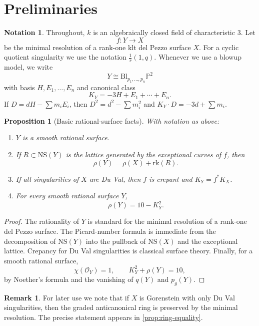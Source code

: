 \documentclass[11pt]{article}
\newtheorem{proposition}[proposition]{Proposition}
\theoremstyle{definition}
\newtheorem{remark}[remark]{Remark}
\newtheorem{notation}[notation]{Notation}
\newcommand{\Pbb}{\mathbb P}
\newcommand{\NS}{\mathrm{NS}}
\newcommand{\rk}{\mathrm{rk}}
\newcommand{\Bl}{\mathrm{Bl}}
\begin{document}
\section{Preliminaries}\label{sec:prelim}

\begin{notation}
Throughout, $k$ is an algebraically closed field of characteristic $3$. Let
\[
f\colon Y\to X
\]
be the minimal resolution of a rank-one klt del Pezzo surface $X$. For a cyclic quotient singularity we use the notation $\frac1r(1,q)$. Whenever we use a blowup model, we write
\[
Y\cong \Bl_{p_1,\dots,p_n}\Pbb^2
\]
with basis $H,E_1,\dots,E_n$ and canonical class
\[
K_Y=-3H+E_1+\cdots+E_n.
\]
If $D=dH-\sum m_iE_i$, then $D^2=d^2-\sum m_i^2$ and $K_Y\cdot D=-3d+\sum m_i$.
\end{notation}

\begin{proposition}[Basic rational-surface facts]\label{prop:basic}
With notation as above:
\begin{enumerate}[label=\textup{(\roman*)}]
\item $Y$ is a smooth rational surface.
\item If $R\subset \NS(Y)$ is the lattice generated by the exceptional curves of $f$, then
\[
\rho(Y)=\rho(X)+\rk(R).
\]
\item If all singularities of $X$ are Du Val, then $f$ is crepant and $K_Y=f^*K_X$.
\item For every smooth rational surface $Y$,
\[
\rho(Y)=10-K_Y^2.
\]
\end{enumerate}
\end{proposition}

\begin{proof}
The rationality of $Y$ is standard for the minimal resolution of a rank-one del Pezzo surface. The Picard-number formula is immediate from the decomposition of $\NS(Y)$ into the pullback of $\NS(X)$ and the exceptional lattice. Crepancy for Du Val singularities is classical surface theory. Finally, for a smooth rational surface,
\[
\chi(\mathcal O_Y)=1,
\qquad
K_Y^2+\rho(Y)=10,
\]
by Noether's formula and the vanishing of $q(Y)$ and $p_g(Y)$.
\end{proof}

\begin{remark}
For later use we note that if $X$ is Gorenstein with only Du Val singularities, then the graded anticanonical ring is preserved by the minimal resolution. The precise statement appears in \cref{prop:ring-equality}.
\end{remark}
\end{document}
